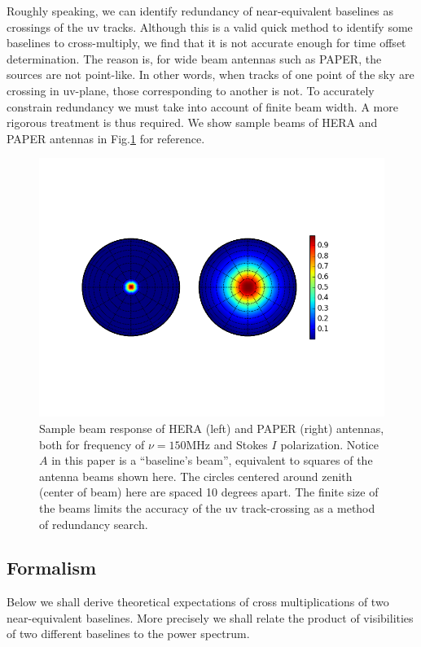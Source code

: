 \documentclass[preprint2,numberedappendix,tighten,twocolappendix]{aastex6}  %
\renewcommand\[{\begin{equation}}
\renewcommand\]{\end{equation}}
\begin{document}
Roughly speaking, we can identify
redundancy of near-equivalent baselines as crossings
of the uv tracks. Although this is a valid quick method to identify some baselines to cross-multiply, we find
that it is not accurate enough for time offset determination. The reason is, for wide beam antennas such as PAPER, the sources are not point-like. 
In other words, when tracks of
one point of the sky are crossing in uv-plane, those corresponding to another is not. To accurately
constrain redundancy we must take into account of finite beam width. A more rigorous treatment is thus required. 
We show sample beams of HERA and PAPER antennas in Fig.\ref{fig:Beam} for reference. 

\begin{figure}[H]
\includegraphics[width=1.2\linewidth]{Beams}

\caption{Sample beam response of HERA (left) and PAPER (right) antennas, both
for frequency of $\nu=150\text{MHz}$ and Stokes $I$ polarization. Notice $A$ in this paper is a ``baseline's beam'', equivalent to squares of the antenna beams shown here. The circles centered around zenith (center of beam) here are
spaced 10 degrees apart. The finite size of the beams limits the accuracy of the uv track-crossing as a method of redundancy search. \label{fig:Beam}}
\end{figure}



\subsection{Formalism}
Below we shall derive theoretical expectations of cross multiplications
of two near-equivalent baselines. More precisely we shall relate
the product of visibilities of two different baselines to the power spectrum. 
\end{document}
